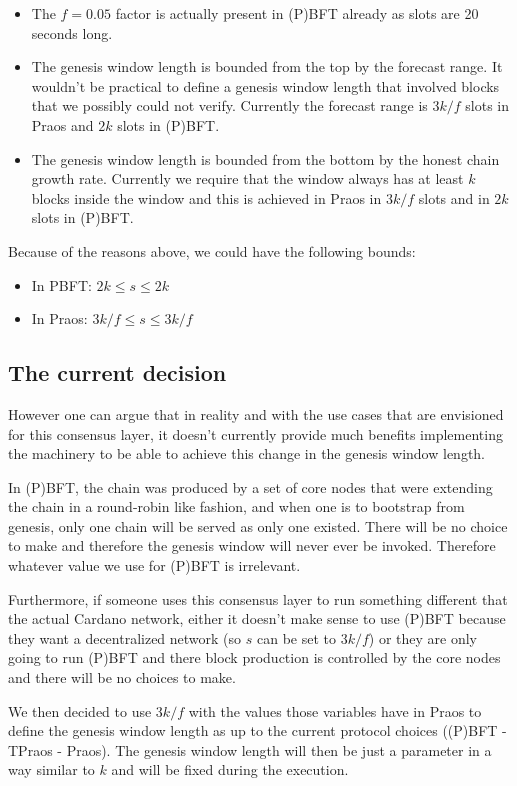 \begin{itemize}
\item The $f = 0.05$ factor is actually present in (P)BFT already as slots are 20
  seconds long.
\item The genesis window length is bounded from the top by the forecast
  range. It wouldn't be practical to define a genesis window length that
  involved blocks that we possibly could not verify. Currently the forecast
  range is $3k/f$ slots in Praos and $2k$ slots in (P)BFT.
\item The genesis window length is bounded from the bottom by the honest chain
  growth rate. Currently we require that the window always has at least $k$
  blocks inside the window and this is achieved in Praos in $3k/f$ slots and in
  $2k$ slots in (P)BFT.
\end{itemize}

Because of the reasons above, we could have the following bounds:
\begin{itemize}
\item In PBFT: $2k \le s \le 2k$
\item In Praos: $3k/f \le s \le 3k/f$
\end{itemize}

\subsection{The current decision}

However one can argue that in reality and with the use cases that are envisioned
for this consensus layer, it doesn't currently provide much benefits
implementing the machinery to be able to achieve this change in the genesis
window length.

In (P)BFT, the chain was produced by a set of core nodes that were extending the
chain in a round-robin like fashion, and when one is to bootstrap from genesis,
only one chain will be served as only one existed. There will be no choice to
make and therefore the genesis window will never ever be invoked. Therefore
whatever value we use for (P)BFT is irrelevant.

Furthermore, if someone uses this consensus layer to run something different
that the actual Cardano network, either it doesn't make sense to use (P)BFT
because they want a decentralized network (so $s$ can be set to $3k/f$) or they
are only going to run (P)BFT and there block production is controlled by the
core nodes and there will be no choices to make.

We then decided to use $3k/f$ with the values those variables have in Praos to
define the genesis window length as up to the current protocol choices ((P)BFT -
TPraos - Praos). The genesis window length will then be just a parameter in a
way similar to $k$ and will be fixed during the execution.

